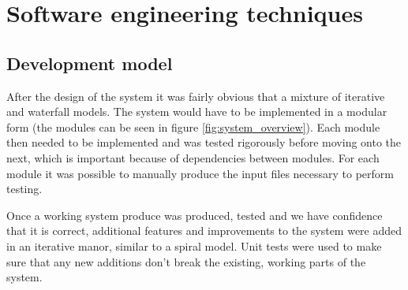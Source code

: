\documentclass[12pt,twoside,notitlepage]{report}
\begin{document}
    \section{Software engineering techniques}
        \subsection{Development model}
            After the design of the system it was fairly obvious that a mixture of iterative and waterfall models. 
            The system would have to be implemented in a modular form (the modules can be seen in figure 
            \ref{fig:system_overview}). Each module then needed to be implemented and was tested rigorously before 
            moving onto the next, which is important because of dependencies between modules. For each module it was 
            possible to manually produce the input files necessary to perform testing.

            Once a working system produce was produced, tested and we have confidence that it is correct, additional 
            features and improvements to the system were added in an iterative manor, similar to a spiral model. Unit 
            tests were used to make sure that any new additions don't break the existing, working parts of the system.
\end{document}
